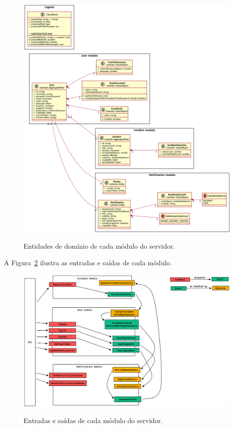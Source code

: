 \begin{figure}[h]
	\caption{\small Entidades de domínio de cada módulo do servidor.}
	\centering
	\includegraphics[width=\textwidth]{../diagrams/out/system_server_all-modules_domain-entities.png}
	\label{f.system_server_all-modules_domain-entities}
\end{figure}

A Figura~\ref{f.system_server_all_modules_commands-observers-events} ilustra as entradas e saídas de cada módulo.

\begin{figure}[h]
	\caption{\small Entradas e saídas de cada módulo do servidor.}
	\centering
	\includegraphics[width=\textwidth]{../diagrams/out/system_server_all_modules_commands-observers-events.png}
	\label{f.system_server_all_modules_commands-observers-events}
\end{figure}

